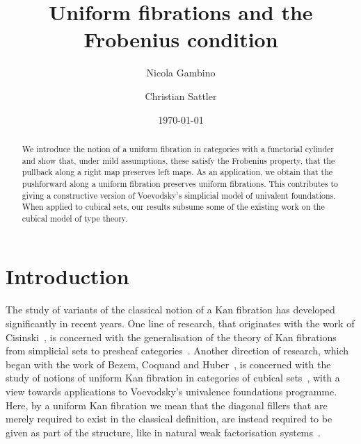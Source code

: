 \documentclass[reqno,10pt,a4paper,oneside,draft]{amsart}
\title{Uniform fibrations and the Frobenius condition}
\begin{document}
\begin{abstract}
We introduce the notion of a uniform fibration in categories with a functorial cylinder and show that, under mild assumptions, these satisfy the Frobenius property, \ie that the pullback along a right map preserves left maps.
As an application, we obtain that the pushforward along a uniform  fibration preserves uniform fibrations.
This contributes to giving a constructive version of Voevodsky's simplicial model of univalent foundations.
When applied to cubical sets, our results  subsume some of the existing work on the cubical model of type theory.
\end{abstract}

\author{Nicola Gambino}
\address{School of Mathematics, University of Leeds, Leeds LS2 9JT, UK}

\author{Christian Sattler}
\address{School of Mathematics, University of Leeds, Leeds LS2 9JT, UK}

\date{\today}

\maketitle

\tableofcontents


\section*{Introduction}

The study of variants of the classical notion of a Kan fibration has developed significantly in recent years. One line of research, that originates with the work of Cisinski~\cite{cisinski-asterisque}, is concerned with the generalisation of the theory of Kan fibrations from simplicial sets to presheaf categories~\cite{cisinski-univalence,moerdijk-minimal}. Another direction of research, which began with the work of Bezem, Coquand and Huber~\cite{coquand-cubical-sets}, is concerned with the study of notions of uniform Kan fibration in categories of cubical sets~\cite{awodey-cubical,coquand-cubical-sets,coquand-variation,huber-thesis,pitts-cubical-nominal,swan-awfs}, with a view towards applications to Voevodsky's univalence foundations programme. Here, by a uniform Kan fibration we mean that the diagonal fillers that are merely required to exist in the classical definition, are instead required to be given as part of the structure, like in natural weak factorisation systems~\cite{grandis-tholen-nwfs}.
\end{document}
